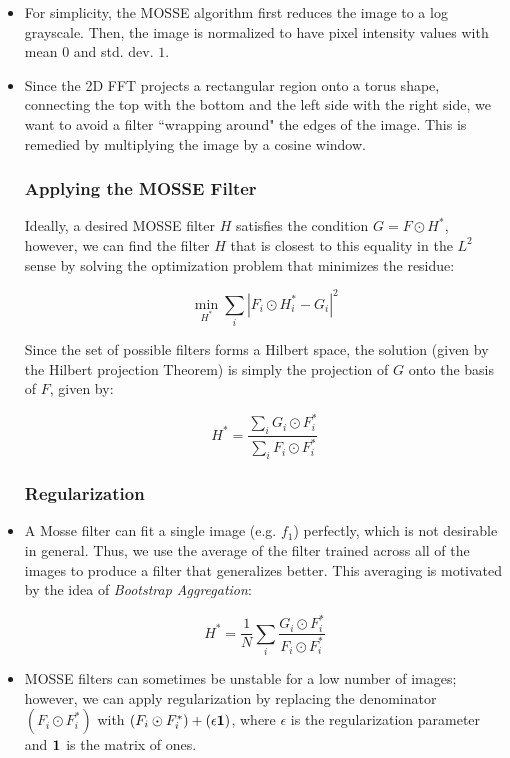 \documentclass[12pt]{article}
\newcommand{\bv}[1]{\ensuremath\mathbf{#1}}
\begin{document}
\begin{itemize}
\item For simplicity, the MOSSE algorithm first reduces the image to a log grayscale. Then, the image is normalized to have pixel intensity values with mean $0$ and std. dev. $1$.

\item Since the 2D FFT projects a rectangular region onto a torus shape, connecting the top with the bottom and the left side with the right side, we want to avoid a filter ``wrapping around" the edges of the image. This is remedied by multiplying the image by a cosine window.

\subsubsection*{Applying the MOSSE Filter}

Ideally, a desired MOSSE filter $H$ satisfies the condition $G = F \odot H^*$, however, we can find the filter $H$ that is closest to this equality in the $L^2$ sense by solving the optimization problem that minimizes the residue:

$$\min_{H^*}\sum_{i}|F_i \odot H_i^* - G_i|^2$$

Since the set of possible filters forms a Hilbert space, the solution (given by the Hilbert projection Theorem) is simply the projection of $G$ onto the basis of $F$, given by:

$$H^* = \frac{\sum_{i} G_i \odot F_i^*}{\sum_{i} F_i \odot F_i^*}$$

\subsubsection*{Regularization}

\item A Mosse filter can fit a single image (e.g. $f_1$) perfectly, which is not desirable in general. Thus, we use the average of the filter trained across all of the images to produce a filter that generalizes better. This averaging is motivated by the idea of \textit{Bootstrap Aggregation}:

$$H^* = \frac{1}{N}\sum_{i} \frac{G_i \odot F_i^*}{F_i \odot F_i^*}$$

\item MOSSE filters can sometimes be unstable for a low number of images; however, we can apply regularization by replacing the denominator $(F_i \odot F_i^*)$ with $(F_i \odot F_i^*) + (\epsilon\bv{1})$, where $\epsilon$ is the regularization parameter and $\bv{1}$ is the matrix of ones. 


\end{itemize}
\end{document}
